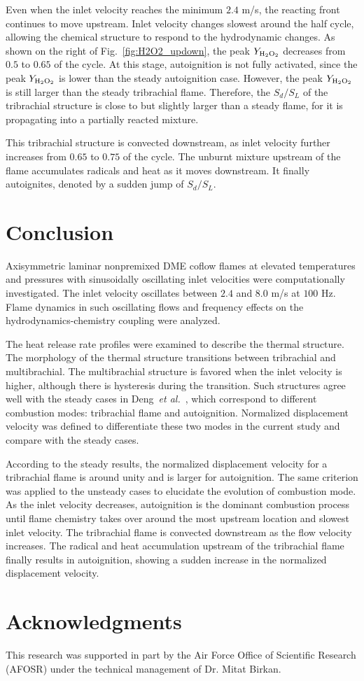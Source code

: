 \documentclass{essci}
\begin{document}
Even when the inlet velocity reaches the minimum $2.4$ m/s, the reacting front continues to move upstream.  Inlet velocity changes slowest around the half cycle, allowing the chemical structure to respond to the hydrodynamic changes.  As shown on the right of Fig.~\ref{fig:H2O2_updown}, the peak $Y_{\rm H{_2}O{_2}}$ decreases from $0.5$ to $0.65$ of the cycle.  At this stage, autoignition is not fully activated, since the peak $Y_{\rm H{_2}O{_2}}$ is lower than the steady autoignition case.  However, the peak $Y_{\rm H{_2}O{_2}}$ is still larger than the steady tribrachial flame.  Therefore, the $S_d/S_L$ of the tribrachial structure is close to but slightly larger than a steady flame, for it is propagating into a partially reacted mixture.

This tribrachial structure is convected downstream, as inlet velocity further increases from $0.65$ to $0.75$ of the cycle.  The unburnt mixture upstream of the flame accumulates radicals and heat as it moves downstream.  It finally autoignites, denoted by a sudden jump of $S_d/S_L$.

\section{Conclusion}

Axisymmetric laminar nonpremixed DME coflow flames at elevated temperatures and pressures with sinusoidally oscillating inlet velocities were computationally investigated.  The inlet velocity oscillates between $2.4$ and $8.0$ m/s at $100$ Hz.  Flame dynamics in such oscillating flows and frequency effects on the hydrodynamics-chemistry coupling were analyzed.

The heat release rate profiles were examined to describe the thermal structure.  The morphology of the thermal structure transitions between tribrachial and multibrachial.  The multibrachial structure is favored when the inlet velocity is higher, although there is hysteresis during the transition.  Such structures agree well with the steady cases in Deng~\emph{et al.}~\cite{deng15b}, which correspond to different combustion modes: tribrachial flame and autoignition.  Normalized displacement velocity was defined to differentiate these two modes in the current study and compare with the steady cases.

According to the steady results, the normalized displacement velocity for a tribrachial flame is around unity and is larger for autoignition.  The same criterion was applied to the unsteady cases to elucidate the evolution of combustion mode.  As the inlet velocity decreases, autoignition is the dominant combustion process until flame chemistry takes over around the most upstream location and slowest inlet velocity.  The tribrachial flame is convected downstream as the flow velocity increases.  The radical and heat accumulation upstream of the tribrachial flame finally results in autoignition, showing a sudden increase in the normalized displacement velocity.

\section*{Acknowledgments}

This research was supported in part by the Air Force Office of Scientific Research (AFOSR) under the technical management of Dr. Mitat Birkan.



\end{document}

